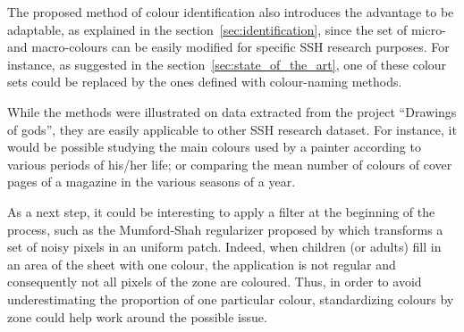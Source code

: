 \documentclass[11pt,a4paper]{article}
\begin{document}
The proposed method of colour identification also introduces the advantage to be adaptable, as explained in the section~\ref{sec:identification}, since the set of micro- and macro-colours can be easily modified for specific SSH research purposes. For instance, as suggested in the section~\ref{sec:state_of_the_art}, one of these colour sets could be replaced by the ones defined with colour-naming methods.

While the methods were illustrated on data extracted from the project ``Drawings of gods'', they are easily applicable to other SSH  research dataset. For instance, it would be possible studying the main colours used by a painter according to various periods of his/her life; or comparing the mean number of colours of cover pages of a magazine in the various seasons of a year.

As a next step, it could be interesting to apply a filter at the beginning of the process, such as the Mumford-Shah regularizer proposed by \citet{erdem2009} which transforms a set of noisy pixels in an uniform patch. 
Indeed, when children (or adults) fill in an area of the sheet with one colour, the application is not regular and consequently not all pixels of the zone are coloured. 
Thus, in order to avoid underestimating the proportion of one particular colour, standardizing colours by zone could help work around the possible issue.




\end{document}
